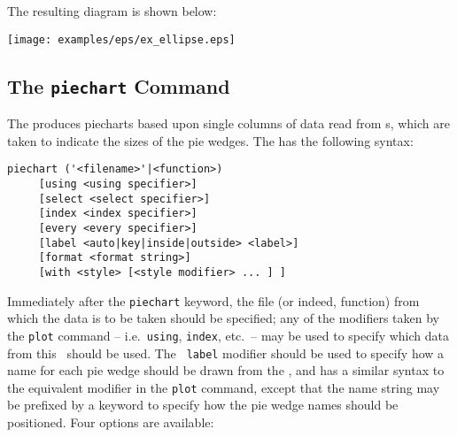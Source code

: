 {{\newline
}\\{\footnotesize
{}\newline
{}\newline
{}\newline
{}\newline
{}\newline
{}\newline
{}\newline
}\\{\footnotesize
{}\newline
{}\newline
}
\nlfcf
The resulting diagram is shown below:
\nlscf
\centerline{\texttt{[image: examples/eps/ex\_ellipse.eps]}}
}

\subsection{The {\tt piechart} Command}
\label{sec:piechart}

The  produces piecharts based upon single columns of data
read from \datafile s, which are taken to indicate the sizes of the pie wedges.
The  has the following syntax:
\begin{verbatim}
piechart ('<filename>'|<function>)
     [using <using specifier>]
     [select <select specifier>]
     [index <index specifier>]
     [every <every specifier>]
     [label <auto|key|inside|outside> <label>]
     [format <format string>]
     [with <style> [<style modifier> ... ] ]
\end{verbatim}

Immediately after the {\tt piechart} keyword, the file (or indeed, function)
from which the data is to be taken should be specified; any of the modifiers
taken by the {\tt plot} command -- i.e.\ {\tt using}, {\tt index}, etc.\ -- may
be used to specify which data from this \datafile\ should be used. The {\tt
label} modifier should be used to specify how a name for each pie wedge should
be drawn from the \datafile, and has a similar syntax to the equivalent
modifier in the {\tt plot} command, except that the name string may be
prefixed by a keyword to specify how the pie wedge names should be positioned.
Four options are available:

